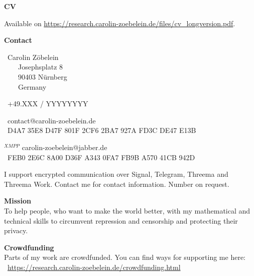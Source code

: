 \begin{flushleft}
    \textbf{CV}\\
\end{flushleft}
Available on \url{https://research.carolin-zoebelein.de/files/cv_longversion.pdf}.


\begin{flushleft}
    \textbf{Contact}
\end{flushleft}
\begin{minipage}[l]{0.39\textwidth}
    \begin{flushleft}
        \faMapMarker* \ Carolin Zöbelein\\
        \ \ \ \ Josephsplatz 8\\
        \ \ \ \ 90403 Nürnberg\\
        \ \ \ \ Germany

        \vspace{0.3cm}
        \faPhone \  +49.XXX / YYYYYYYY    %
    \end{flushleft}
\end{minipage}
\begin{minipage}[r]{0.59\textwidth}
    \begin{flushright}
        \faEnvelope[regular] \ contact@carolin-zoebelein.de\\
        \faKey \ D4A7 35E8 D47F 801F 2CF6 2BA7 927A FD3C DE47 E13B

        \vspace{0.3cm}
        \faComments[regular]$^{XMPP}$ carolin-zoebelein@jabber.de\\
        \faKey \ FEB0 2E6C 8A00 D36F A343 0FA7 FB9B A570 41CB 942D
    \end{flushright}
\end{minipage}

\begin{flushleft}
    I support encrypted communication over Signal, Telegram, Threema and Threema Work. Contact me for contact information. Number on request.
\end{flushleft}


\begin{center}
    \textbf{Mission}\\
    To help people, who want to make the world better, with my mathematical and technical skills to circumvent repression and censorship and protecting their privacy.
\end{center}

\begin{flushleft}
    \textbf{Crowdfunding}\\
    Parts of my work are crowdfunded. You can find ways for supporting me here:\\
    \faDonate \ \url{https://research.carolin-zoebelein.de/crowdfunding.html}
\end{flushleft}

